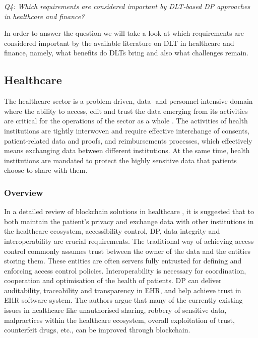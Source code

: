 \textit{Q4: Which requirements are considered important by DLT-based DP approaches in healthcare and finance?} \newline

In order to answer the question we will take a look at which requirements are considered important by the available literature on DLT in healthcare and finance, namely, what benefits do DLTs bring and also what challenges remain. 

\subsection{Healthcare}
\label{ssec:healthcare}

The healthcare sector is a problem-driven, data- and personnel-intensive domain where the ability to access, edit and trust the data emerging from its activities are critical for the operations of the sector as a whole \cite{hasselgren2020blockchain}. The activities of health institutions are tightly interwoven and require effective interchange of consents, patient-related data and proofs, and reimbursements processes, which effectively means exchanging data between different institutions. At the same time, health institutions are mandated to protect the highly sensitive data that patients choose to share with them. 

\subsubsection{Overview}
\label{sssec:overview}

In a detailed review of blockchain solutions in healthcare \cite{hasselgren2020blockchain}, it is suggested that to both maintain the patient’s privacy and exchange data with other institutions in the healthcare ecosystem, accessibility control, DP, data integrity and interoperability are crucial requirements. The traditional way of achieving access control commonly assumes trust between the owner of the data and the entities storing them. These entities are often servers fully entrusted for defining and enforcing access control policies. Interoperability is necessary for coordination, cooperation and optimisation of the health of patients. DP can deliver auditability, traceability and transparency in EHR, and help achieve trust in EHR software system. The authors argue that many of the currently existing issues in healthcare like unauthorised sharing, robbery of sensitive data, malpractices within the healthcare ecosystem, overall exploitation of trust, counterfeit drugs, etc., can be improved through blockchain. 

